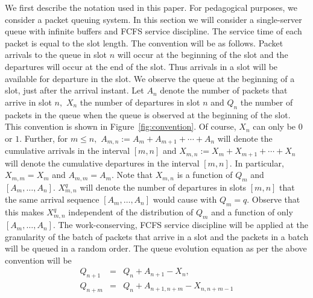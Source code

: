 \documentclass[11pt]{article}
\begin{document}
We first describe the notation used in this paper. For pedagogical
purposes, we consider a packet queuing system. In this section we will
consider a single-server queue with infinite buffers and FCFS service
discipline.  The service time of each packet is equal to the slot
length. The convention will be as follows.  Packet arrivals to the
queue in slot $n$ will occur at the beginning of the slot and the
departures will occur at the end of the slot. Thus arrivals in a slot
will be available for departure in the slot. We observe the queue at
the beginning of a slot, just after the arrival instant. Let $A_n$
denote the number of packets that arrive in slot $n,$ $X_n$ the number
of departures in slot $n$ and $Q_n$ the number of packets in the queue
when the queue is observed at the beginning of the slot. This
convention is shown in Figure~\ref{fig:convention}. Of course, $X_n$
can only be $0$ or $1.$ Further, for $m \leq n,$ $A_{m,n}:=A_m +
A_{m+1} + \cdots + A_n$ will denote the cumulative arrivals in the
interval $[m,n]$ and $X_{m,n}:=X_m + X_{m+1} + \cdots + X_n$ will
denote the cumulative departures in the interval $[m,n].$ In
particular, $X_{m,m}=X_m$ and $A_{m,m}=A_m.$ Note that $X_{m,n}$ is a
function of $Q_m$ and $[A_m,\ldots, A_n].$ $X^q_{m,n}$ will denote the
number of departures in slots $[m,n]$ that the same arrival sequence
$[A_m,\ldots, A_n]$ would cause with $Q_m=q.$ Observe that this makes
$X^q_{m,n}$ independent of the distribution of $Q_m$ and a function of
only $[A_m,\ldots, A_n].$ The work-conserving, FCFS service discipline
will be applied at the granularity of the batch of packets that arrive
in a slot and the packets in a batch will be queued in a random order.
The queue evolution equation as per the above convention will be
\begin{eqnarray}
  Q_{n+1} &=& Q_n + A_{n+1} - X_{n}, \nonumber \\
  Q_{n+m} &=& Q_n + A_{n+1,n+m} - X_{n,n+m-1}
  \label{eq:queue-evolution}
\end{eqnarray}
\end{document}
